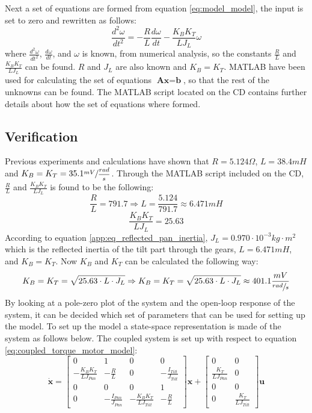 Next a set of equations are formed from equation \ref{eq:model_model}, the input is set to zero and rewritten as follows:
\begin{equation}
	\frac{d^{2}\omega}{dt^{2}} = - \frac{R}{L} \frac{d\omega}{dt} - \frac{K_B K_T}{L J_L} \omega
\end{equation}
where $\frac{d^{2}\omega}{dt^{2}}$, $\frac{d\omega}{dt}$, and $\omega$ is known, from numerical analysis, so the constants $\frac{R}{L}$ and $\frac{K_B K_T}{L J_L}$ can be found. $R$ and $J_L$ are also known and $K_B = K_T$. MATLAB have been used for calculating the set of equations $\textbf{Ax} = \textbf{b}$, so that the rest of the unknowns can be found. The MATLAB script located on the CD contains further details about how the set of equations where formed.

\subsection{Verification}
Previous experiments and calculations have shown that $R = 5.124\Omega$, $L = 38.4mH$ and $K_B = K_T = 35.1 \sfrac{mV}{\dfrac{rad}{s}}$. Through the MATLAB script included on the CD, $\frac{R}{L}$ and $\frac{K_B K_T}{L J_L}$ is found to be the following:
\begin{equation}
	\frac{R}{L} = 791.7 \Rightarrow L = \frac{5.124}{791.7} \approx 6.471mH
\end{equation}
\begin{equation}
	\frac{K_B K_T}{L J_L} = 25.63\label{eq:constants}
\end{equation}
According to equation \ref{app:eq_reflected_pan_inertia}, $J_L = 0.970 \cdot 10^{-3} kg \cdot m^{2}$ which is the reflected inertia of the tilt part through the gears, $L = 6.471mH$, and $K_B = K_T$. Now $K_B$ and $K_T$ can be calculated the following way:
\begin{equation}
	K_B = K_T = \sqrt{25.63 \cdot L \cdot J_L} \Rightarrow K_B = K_T = \sqrt{25.63 \cdot L \cdot J_L} \approx 401.1 \frac{mV}{\sfrac{rad}{s}}
\end{equation}
By looking at a pole-zero plot of the system and the open-loop response of the system, it can be decided which set of parameters that can be used for setting up the model. To set up the model a state-space representation is made of the system as follows below. The coupled system is set up with respect to equation \ref{eq:coupled_torque_motor_model}:
\[
 \dot{\textbf{x}} =
 \begin{bmatrix}
   0 & 1 & 0 & 0\\
   - \frac{K_B K_T}{L J_{Pan}} & - \frac{R}{L} & 0 & - \frac{I_{Tilt}}{J_{Tilt}}\\
   0 & 0 & 0 & 1\\
   0 & - \frac{I_{Pan}}{J_{Pan}} & - \frac{K_B K_T}{L J_{Tilt}} & - \frac{R}{L}
 \end{bmatrix}
 \textbf{x} +
 \begin{bmatrix}
   0 & 0\\
   \frac{K_T}{L J_{Pan}} & 0\\
   0 & 0\\
   0 & \frac{K_T}{L J_{Tilt}}
 \end{bmatrix}
 \textbf{u}
\]

